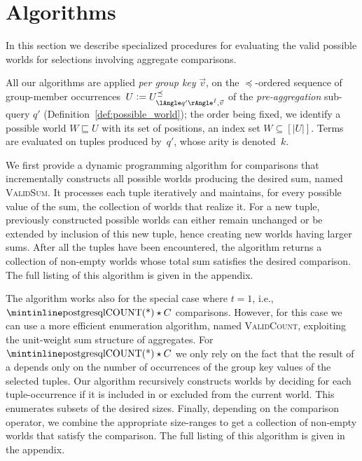 \section{Algorithms}
\label{sec:algorithms}

In this section we describe specialized procedures for evaluating the valid possible worlds for selections involving aggregate comparisons.


All our algorithms are applied \emph{per group key} $\vec v$, on the
$\preceq$-ordered sequence of group-member
occurrences~$U\defeq\nobreak U^{\preceq}_{\angsem{\hat I}{q'},\vec v}$ of the
\emph{pre-aggregation} sub-query $q'$
(Definition~\ref{def:possible_world}); the order being fixed, we
identify a possible world $W\sqsubseteq U$ with its set of positions, an
index set $W\subseteq [|U|]$. Terms are evaluated on tuples produced
by~$q'$, whose arity is denoted~$k$.

We first provide a dynamic programming algorithm for  comparisons that incrementally constructs all possible worlds producing the desired sum, named \textsc{ValidSum}.
It processes each tuple iteratively and maintains, for every possible value of the sum, the collection of worlds that realize it.
For a new tuple, previously constructed possible worlds can either remain unchanged or be extended by inclusion of this new tuple, hence creating new worlds having larger sums.
After all the tuples have been encountered, the algorithm returns a collection of non-empty worlds whose total sum satisfies the desired comparison.
The full listing of this algorithm is given in the appendix.

The algorithm works also for the special case where $t=1$, i.e., $\text{\sql{COUNT(*)}}\op C$ comparisons.
However, for this case we can use a more efficient enumeration algorithm, named \textsc{ValidCount}, exploiting the unit-weight sum structure of  aggregates.
For $\text{\sql{COUNT(*)}}\op C$ we only rely on the fact that the result of a  depends only on the number of occurrences of the group key values of the selected tuples.
Our algorithm recursively constructs worlds by deciding for each tuple-occurrence if it is included in or excluded from the current world.
This enumerates subsets of the desired sizes.
Finally, depending on the comparison operator, we combine the appropriate size-ranges to get a collection of non-empty worlds that satisfy the comparison.
The full listing of this algorithm is given in the appendix.

